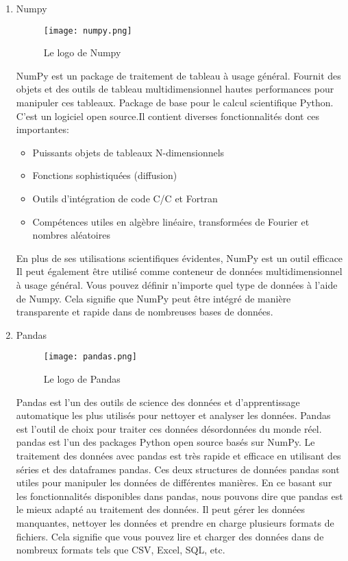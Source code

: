     \begin{enumerate}\bfseries
        \item Numpy
        \begin{figure}[H]
            \centering
            \texttt{[image: numpy.png]}
            \caption{Le logo de Numpy}\label{fig:numpy}
        \end{figure}
        \normalfont
        NumPy est un package de traitement de tableau à usage général. Fournit des objets et des outils de tableau multidimensionnel hautes performances  pour manipuler ces tableaux. Package de base pour le calcul scientifique  Python. C'est un logiciel open source.Il contient diverses fonctionnalités dont ces importantes:
        \begin{itemize}[label=$\bullet$]
            \item Puissants objets de tableaux N-dimensionnels 
            \item Fonctions sophistiquées (diffusion)
            \item Outils d'intégration de code C/C et Fortran
            \item Compétences utiles en algèbre linéaire, transformées de Fourier et nombres aléatoires
        \end{itemize}  
        
        En plus de ses utilisations scientifiques évidentes, NumPy est un outil efficace Il peut également être utilisé comme  conteneur de données  multidimensionnel à usage général. Vous pouvez définir n'importe quel type de données  à l'aide de Numpy. Cela signifie que NumPy peut être intégré de manière transparente et rapide dans de nombreuses bases de données.

        \bfseries
        \item Pandas
        \begin{figure}[H]
            \centering
            \texttt{[image: pandas.png]}
            \caption{Le logo de Pandas}\label{fig:pandas}
        \end{figure}
        \normalfont
        Pandas est l'un des outils de science des données et d'apprentissage automatique les plus utilisés pour nettoyer et analyser les données. 
        Pandas est l'outil de choix pour traiter ces données désordonnées du monde réel.  pandas est l'un des packages Python open source basés sur NumPy. 
        Le traitement des données avec pandas est très rapide et efficace en utilisant des séries et des dataframes pandas. Ces deux structures de données pandas sont utiles pour manipuler les données de différentes manières. 
        En ce basant sur les fonctionnalités disponibles dans  pandas, nous pouvons dire que  pandas est le mieux adapté au traitement des données. Il peut gérer les données manquantes, nettoyer les données et prendre en charge plusieurs formats de fichiers. Cela signifie que vous pouvez lire et charger des données dans de nombreux formats tels que CSV, Excel, SQL, etc.



\end{enumerate}
